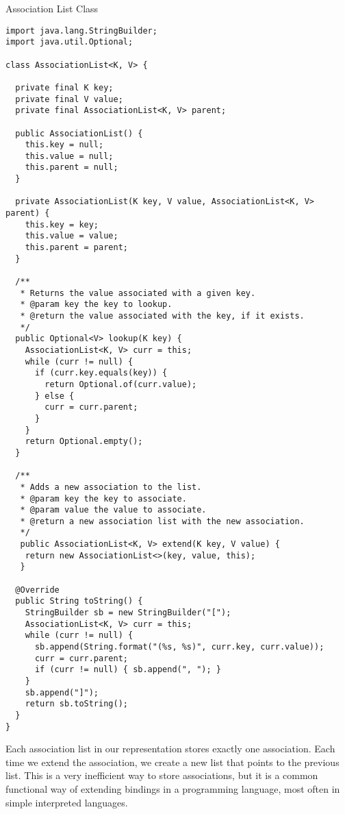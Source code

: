 \begin{cl}[]{Association List Class}
\begin{lstlisting}[language=MyJava]
import java.lang.StringBuilder;
import java.util.Optional;

class AssociationList<K, V> {
  
  private final K key;
  private final V value;
  private final AssociationList<K, V> parent;
  
  public AssociationList() {
    this.key = null;
    this.value = null;
    this.parent = null;
  }

  private AssociationList(K key, V value, AssociationList<K, V> parent) {
    this.key = key;
    this.value = value;
    this.parent = parent;
  }
  
  /**
   * Returns the value associated with a given key.
   * @param key the key to lookup.
   * @return the value associated with the key, if it exists.
   */
  public Optional<V> lookup(K key) {
    AssociationList<K, V> curr = this;
    while (curr != null) {
      if (curr.key.equals(key)) {
        return Optional.of(curr.value);
      } else {
        curr = curr.parent;
      }
    }
    return Optional.empty();
  }
  
  /**
   * Adds a new association to the list.
   * @param key the key to associate.
   * @param value the value to associate.
   * @return a new association list with the new association.
   */
   public AssociationList<K, V> extend(K key, V value) {
    return new AssociationList<>(key, value, this);
   }
  
  @Override
  public String toString() {
    StringBuilder sb = new StringBuilder("[");
    AssociationList<K, V> curr = this;
    while (curr != null) {
      sb.append(String.format("(%s, %s)", curr.key, curr.value));
      curr = curr.parent;
      if (curr != null) { sb.append(", "); }
    }
    sb.append("]");
    return sb.toString();
  }
}
\end{lstlisting}
\end{cl}

Each association list in our representation stores exactly one association. Each time we extend the association, we create a new list that points to the previous list. This is a very inefficient way to store associations, but it is a common functional way of extending bindings in a programming language, most often in simple interpreted languages.